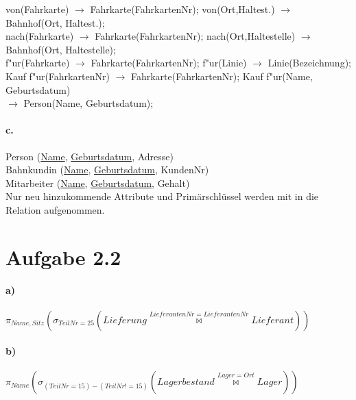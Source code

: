 \documentclass[12pt]{article}
\newcommand{\arrowright}{$\longrightarrow$ }
\begin{document}
 	von(Fahrkarte) \arrowright Fahrkarte(FahrkartenNr); von(Ort,Haltest.) \arrowright Bahnhof(Ort, Haltest.);\\[1.1em]
 	
 	nach(Fahrkarte) \arrowright Fahrkarte(FahrkartenNr); nach(Ort,Haltestelle) \arrowright Bahnhof(Ort, Haltestelle);\\[1.1em]
 	
 	f"ur(Fahrkarte) \arrowright Fahrkarte(FahrkartenNr); f"ur(Linie) \arrowright Linie(Bezeichnung);\\[1.1em]
 	
 	Kauf f"ur(FahrkartenNr) \arrowright Fahrkarte(FahrkartenNr); Kauf f"ur(Name, Geburtsdatum)\\ \arrowright Person(Name, Geburtsdatum);\\[1.1em]
 	
 	\paragraph*{c.}
 	Person (\underline{Name}, \underline{Geburtsdatum}, Adresse) \\[1,3em]
 	
 	Bahnkundin (\underline{Name}, \underline{Geburtsdatum}, KundenNr) \\[1,3em]
 	
 	Mitarbeiter (\underline{Name}, \underline{Geburtsdatum}, Gehalt) \\[1,3em]
 	Nur neu hinzukommende Attribute und Primärschlüssel werden mit in die Relation aufgenommen.
 		
 	\section*{Aufgabe 2.2}
 	
 	\paragraph*{a)}
 	$\pi_{Name, Sitz}(\sigma_{TeilNr=25}(Lieferung \overset{LieferantenNr = LieferantenNr}{\bowtie} Lieferant))$
 	
 	\paragraph*{b)}
 	$\pi_{Name}(\sigma_{(TeilNr=15) - (TeilNr != 15)}(Lagerbestand \overset{Lager = Ort}{\bowtie} Lager))$
 	
\end{document}
